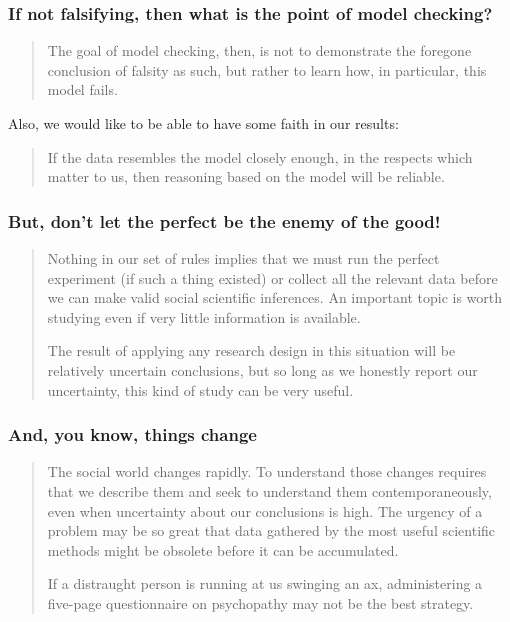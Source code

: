 \documentclass{beamer}
\begin{document}
\begin{frame}
\frametitle{If not falsifying, then what is the point of model checking?}

\begin{quote}
The goal of model checking, then, is not to demonstrate the foregone conclusion of falsity as such, but rather to learn how, in particular, this model fails. 
\end{quote}

Also, we would like to be able to have some faith in our results:
\begin{quote} 
If the data resembles the model closely enough, in the respects which matter to us, then reasoning based on the model will be reliable.
\end{quote}

\end{frame}

\begin{frame}
\frametitle{But, don't let the perfect be the enemy of the good!}

\begin{quote}
Nothing in our set of rules implies that we must run the perfect experiment (if such a thing existed) or collect all the relevant data before we can make valid social scientific inferences. An important topic is worth studying even if very little information is available.

\bigskip

The result of applying any research design in this situation will be relatively uncertain conclusions, but so long as we honestly report our uncertainty, this kind of study can be very useful. 
\end{quote}

\end{frame}

\begin{frame}
\frametitle{And, you know, things change}

\begin{quote}
The social world changes rapidly. To understand those changes requires that we describe them and seek to understand them contemporaneously, even when uncertainty about our conclusions is high. The urgency of a problem may be so great that data gathered by the most useful scientific methods might be obsolete before it can be accumulated. 

\bigskip

If a distraught person is running at us swinging an ax, administering a five-page questionnaire on psychopathy may not be the best strategy. 
\end{quote}

\end{frame}
\end{document}
